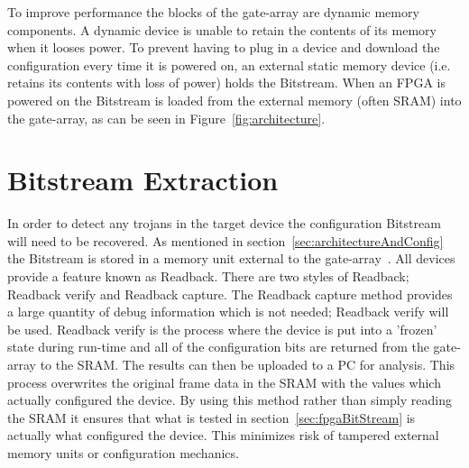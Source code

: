To improve performance the blocks of the gate-array are dynamic memory components.
A dynamic device is unable to retain the contents of its memory when it looses power.
To prevent having to plug in a device and download the configuration every time it is powered on, an external static memory device (i.e. retains its contents with loss of power) holds the \gls{Bitstream}. 
When an \acrshort{FPGA} is powered on the \gls{Bitstream} is loaded from the external memory (often \acrfull{SRAM}) into the gate-array, as can be seen in Figure~\ref{fig:architecture}.


\section{\gls{Bitstream} Extraction} \label{sec:bitstreamExtraction}
In order to detect any trojans in the \gls{target} device the configuration \gls{Bitstream} will need to be recovered.
As mentioned in section~\ref{sec:architectureAndConfig} the \gls{Bitstream} is stored in a memory unit external to the gate-array~\cite{virtex5ConfigGuide}.
All \Xilinx devices provide a feature known as \gls{Readback}.
There are two styles of \gls{Readback}; \gls{Readback} verify and \gls{Readback} capture.
The \gls{Readback} capture method provides a large quantity of debug information which is not needed; \gls{Readback} verify will be used.
\gls{Readback} verify is the process where the device is put into a 'frozen' state during run-time and all of the configuration bits are returned from the gate-array to the \acrshort{SRAM}. 
The results can then be uploaded to a \acrfull{PC} for analysis.
This process overwrites the original frame data in the \acrshort{SRAM} with the values which actually configured the device. 
By using this method rather than simply reading the \acrshort{SRAM} it ensures that what is tested in section~\ref{sec:fpgaBitStream} is actually what configured the device.
This minimizes risk of tampered external memory units or configuration mechanics. 


